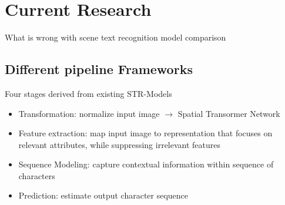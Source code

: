 \chapter{Current Research}\label{ch:research}

What is wrong with scene text recognition model comparison\section{Different pipeline Frameworks}
\cite{baek_what_2019}
Four stages derived from existing STR-Models
\begin{itemize}
    \item Transformation: normalize input image $\rightarrow$ Spatial Transormer Network
    \item Feature extraction: map input image to representation that focuses on relevant attributes,
        while suppressing irrelevant features
    \item Sequence Modeling: capture contextual information within sequence of characters
    \item Prediction: estimate output character sequence
\end{itemize}


